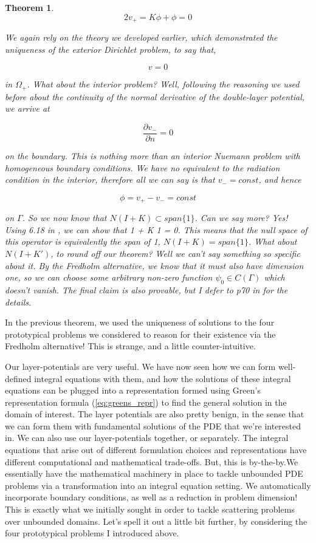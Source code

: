 \documentclass[12pt, a4, twoside]{article}
\newtheorem{theorem}{Theorem}[section]
\begin{document}
\begin{theorem}
    $$ 2v_+ = K\phi + \phi = 0 $$

    We again rely on the theory we developed earlier, which demonstrated the uniqueness of the exterior Dirichlet problem, to say that,

    $$ v = 0$$

    in $\Omega_+$. What about the interior problem? Well, following the reasoning we used before about the continuity of the normal derivative of the double-layer potential, we arrive at

    $$ \frac{\partial v_-}{ \partial n} = 0 $$

    on the boundary. This is nothing more than an interior Nuemann problem with homogeneous boundary conditions. We have no equivalent to the radiation condition in the interior, therefore all we can say is that $v_- = const$, and hence

    $$ \phi = v_+-v_- = const$$

    on $\Gamma$. So we now know that $N(I+K) \subset span \{ 1 \}$. Can we say more? Yes! Using 6.18 in \cite*[]{kress2012}, we can show that 1 + K 1 = 0. This means that the null space of this operator is equivalently the span of 1, $N(I+K) = span \{ 1 \}$. What about $N(I+K')$, to round off our theorem? Well we can't say something so specific about it. By the Fredholm alternative, we know that it must also have dimension one, so we can choose some arbitrary non-zero function $\psi_0 \in C(\Gamma)$ which doesn't vanish. The final claim is also provable, but I defer to p70 in \cite*[]{kress2012} for the details.
\end{theorem}

In the previous theorem, we used the uniqueness of solutions to the four prototypical problems we considered to reason for their existence via the Fredholm alternative! This is strange, and a little counter-intuitive.


Our layer-potentials are very useful. We have now seen how we can form well-defined integral equations with them, and how the solutions of these integral equations can be plugged into a representation formed using Green's representation formula (\ref{eq:greens_repr}) to find the general solution in the domain of interest. The layer potentials are also pretty benign, in the sense that we can form them with fundamental solutions of the PDE that we're interested in. We can also use our layer-potentials together, or separately. The integral equations that arise out of different formulation choices and representations have different computational and mathematical trade-offs. But, this is by-the-by.We essentially have the mathematical machinery in place to tackle unbounded PDE problems via a transformation into an integral equation setting. We automatically incorporate boundary conditions, as well as a reduction in problem dimension! This is exactly what we initially sought in order to tackle scattering problems over unbounded domains. Let's spell it out a little bit further, by considering the four prototypical problems I introduced above.
\end{document}
